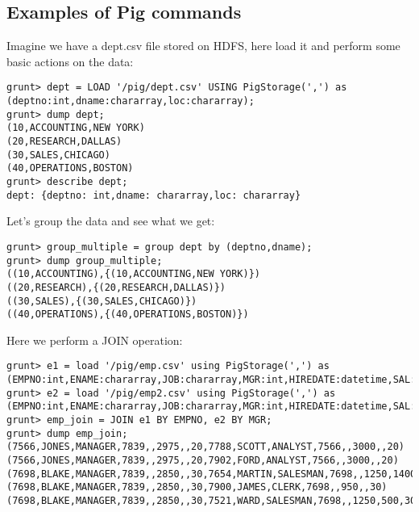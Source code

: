 \documentclass{beamer}[10pt, usepdftitle=false handout]
\begin{document}
\subsection{Examples of Pig commands}
\begin{frame}[fragile]
Imagine we have a dept.csv file stored on HDFS, here load it and perform some basic actions on the data:
\vspace*{0.6em}
\begingroup
\fontsize{6pt}{10pt}\selectfont
\begin{verbatim}
grunt> dept = LOAD '/pig/dept.csv' USING PigStorage(',') as (deptno:int,dname:chararray,loc:chararray);
grunt> dump dept;
(10,ACCOUNTING,NEW YORK)
(20,RESEARCH,DALLAS)
(30,SALES,CHICAGO)
(40,OPERATIONS,BOSTON)
grunt> describe dept;
dept: {deptno: int,dname: chararray,loc: chararray}
\end{verbatim}
\endgroup

Let's group the data and see what we get:

\begingroup
\fontsize{6pt}{10pt}\selectfont
\begin{verbatim}
grunt> group_multiple = group dept by (deptno,dname);
grunt> dump group_multiple;
((10,ACCOUNTING),{(10,ACCOUNTING,NEW YORK)})
((20,RESEARCH),{(20,RESEARCH,DALLAS)})
((30,SALES),{(30,SALES,CHICAGO)})
((40,OPERATIONS),{(40,OPERATIONS,BOSTON)})
\end{verbatim}
\endgroup

\end{frame}
\begin{frame}[fragile]
Here we perform a JOIN operation:
\vspace*{0.6em}
\begingroup
\fontsize{6pt}{10pt}\selectfont
\begin{verbatim}
grunt> e1 = load '/pig/emp.csv' using PigStorage(',') as
(EMPNO:int,ENAME:chararray,JOB:chararray,MGR:int,HIREDATE:datetime,SAL:int,COMM:int,DEPTNO:int);
grunt> e2 = load '/pig/emp2.csv' using PigStorage(',') as 
(EMPNO:int,ENAME:chararray,JOB:chararray,MGR:int,HIREDATE:datetime,SAL:int,COMM:int,DEPTNO:int);
grunt> emp_join = JOIN e1 BY EMPNO, e2 BY MGR;
grunt> dump emp_join;
(7566,JONES,MANAGER,7839,,2975,,20,7788,SCOTT,ANALYST,7566,,3000,,20)
(7566,JONES,MANAGER,7839,,2975,,20,7902,FORD,ANALYST,7566,,3000,,20)
(7698,BLAKE,MANAGER,7839,,2850,,30,7654,MARTIN,SALESMAN,7698,,1250,1400,30)
(7698,BLAKE,MANAGER,7839,,2850,,30,7900,JAMES,CLERK,7698,,950,,30)
(7698,BLAKE,MANAGER,7839,,2850,,30,7521,WARD,SALESMAN,7698,,1250,500,30)
\end{verbatim}
\endgroup

\end{frame}
\end{document}
